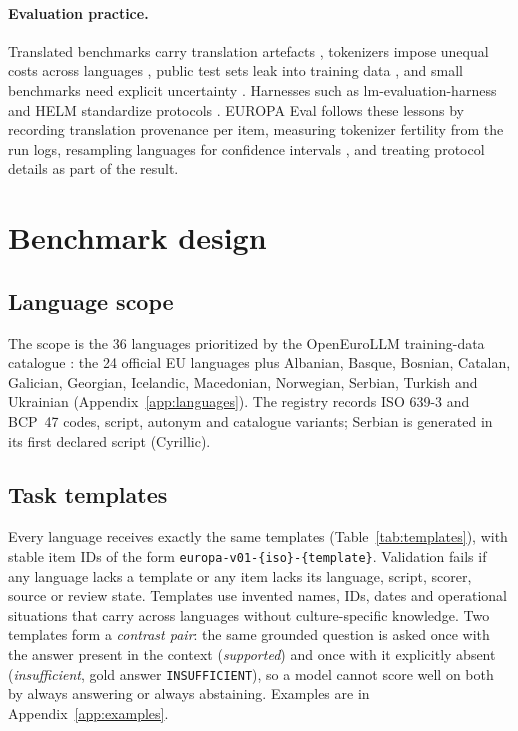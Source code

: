\documentclass[11pt]{article}
\begin{document}
\paragraph{Evaluation practice.} Translated benchmarks carry translation artefacts \citep{artetxe2020translation}, tokenizers impose unequal costs across languages \citep{rust2021tokenizer,petrov2023tokenizer,ahia2023cost}, public test sets leak into training data \citep{sainz2023contamination,oren2024contamination}, and small benchmarks need explicit uncertainty \citep{miller2024errorbars,polo2024tinybenchmarks}. Harnesses such as lm-evaluation-harness and HELM standardize protocols \citep{gao2024lmeval,biderman2024lessons,liang2023helm}. EUROPA Eval follows these lessons by recording translation provenance per item, measuring tokenizer fertility from the run logs, resampling languages for confidence intervals \citep{efron1994bootstrap}, and treating protocol details as part of the result.

\section{Benchmark design}
\label{sec:design}

\subsection{Language scope}
The scope is the 36 languages prioritized by the OpenEuroLLM training-data catalogue \citep{oellmcatalogue}: the 24 official EU languages plus Albanian, Basque, Bosnian, Catalan, Galician, Georgian, Icelandic, Macedonian, Norwegian, Serbian, Turkish and Ukrainian (Appendix~\ref{app:languages}). The registry records ISO 639-3 and BCP~47 codes, script, autonym and catalogue variants; Serbian is generated in its first declared script (Cyrillic).

\subsection{Task templates}
Every language receives exactly the same \nTemplates{} templates (Table~\ref{tab:templates}), with stable item IDs of the form \texttt{europa-v01-\{iso\}-\{template\}}. Validation fails if any language lacks a template or any item lacks its language, script, scorer, source or review state. Templates use invented names, IDs, dates and operational situations that carry across languages without culture-specific knowledge. Two templates form a \emph{contrast pair}: the same grounded question is asked once with the answer present in the context (\emph{supported}) and once with it explicitly absent (\emph{insufficient}, gold answer \texttt{INSUFFICIENT}), so a model cannot score well on both by always answering or always abstaining. Examples are in Appendix~\ref{app:examples}.
\end{document}
